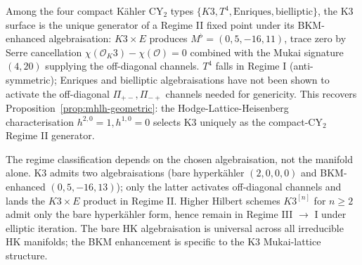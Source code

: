 \begin{remark}
\label{rem:m-flat-as-canonical-regime-ii}
Among the four compact K\"ahler CY$_2$ types
$\{K3, T^4, \mathrm{Enriques}, \mathrm{bielliptic}\}$, the K$3$ surface
is the unique generator of a Regime II fixed point under its
BKM-enhanced algebraisation:
$K3 \times E$ produces $M^\flat = (0, 5, -16, 11)$, trace zero by
Serre cancellation $\chi(\mathcal{O}_K3) - \chi(\mathcal{O}) = 0$ combined
with the Mukai signature $(4, 20)$ supplying the off-diagonal channels.
$T^4$ falls in Regime I (anti-symmetric); Enriques and bielliptic
algebraisations have not been shown to activate the off-diagonal
$\Pi_{+-}, \Pi_{-+}$ channels needed for genericity. This recovers
Proposition~\ref{prop:mhlh-geometric}: the Hodge-Lattice-Heisenberg
characterisation $h^{2, 0} = 1, h^{1, 0} = 0$ selects K$3$ uniquely as
the compact-CY$_2$ Regime II generator.
\end{remark}

\begin{remark}
\label{rem:bb-regimes}
The regime classification depends on the chosen
algebraisation, not the manifold alone. K$3$ admits two algebraisations
\textup{(}bare hyperk\"ahler $(2, 0, 0, 0)$ and BKM-enhanced
$(0, 5, -16, 13)$\textup{);} only the latter activates off-diagonal channels
and lands the $K3 \times E$ product in Regime II. Higher Hilbert schemes
$K3^{[n]}$ for $n \geq 2$ admit only the bare hyperk\"ahler form, hence
remain in Regime III $\to$ I under elliptic iteration. The bare HK
algebraisation is universal across all irreducible HK manifolds; the
BKM enhancement is specific to the K$3$ Mukai-lattice structure.
\end{remark}


